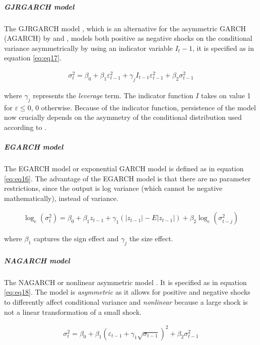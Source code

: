\documentclass[a4paper, nobind]{templates/ociamthesis}
\begin{document}
\hypertarget{gjrgarch-model}{%
\subparagraph{GJRGARCH model}\label{gjrgarch-model}}

\noindent The GJRGARCH model \autocite{glosten1993}, which is an alternative for the asymmetric GARCH (AGARCH) by \textcite{engle1990} and \textcite{engle1993}, models both positive as negative shocks on the conditional variance asymmetrically by using an indicator variable \(I_t-1\), it is specified as in equation \eqref{eq:eq17}.

\begin{align}
\sigma_t^2 = \beta_0 + \beta_1 \varepsilon_{t-1}^2 + \gamma_j I_{t-1} \varepsilon_{t-1}^2 + \beta_2 \sigma_{t-1}^2
 \label{eq:eq17}
\end{align}

\noindent where \(\gamma_j\) represents the \emph{leverage} term. The indicator function \(I\) takes on value 1 for \(\varepsilon \le 0\), 0 otherwise. Because of the indicator function, persistence of the model now crucially depends on the asymmetry of the conditional distribution used according to \textcite{ghalanos2020}.

\hypertarget{egarch-model}{%
\subparagraph{EGARCH model}\label{egarch-model}}

\noindent The EGARCH model or exponential GARCH model \autocite{nelson1991} is defined as in equation \eqref{eq:eq16}. The advantage of the EGARCH model is that there are no parameter restrictions, since the output is log variance (which cannot be negative mathematically), instead of variance.

\begin{align}
\log_e(\sigma_t^2) = \beta_0 + \beta_1 z_{t-1} + \gamma_1 (|z_{t-1}| - E|z_{t-1}|)+ \beta_2 \log_e(\sigma_{t-j}^2)
 \label{eq:eq16}
\end{align}

\noindent where \(\beta_1\) captures the sign effect and \(\gamma_j\) the size effect.

\hypertarget{nagarch-model}{%
\subparagraph{NAGARCH model}\label{nagarch-model}}

\noindent The NAGARCH or nonlinear asymmetric model \autocite{engle1993}. It is specified as in equation \eqref{eq:eq18}. The model is \emph{asymmetric} as it allows for positive and negative shocks to differently affect conditional variance and \emph{nonlinear} because a large shock is not a linear transformation of a small shock.

\begin{align}
\sigma_t^2 = \beta_0 + \beta_1 (\varepsilon_{t-1}+ \gamma_1 \sqrt{\sigma_{t-1}})^2 + \beta_2 \sigma_{t-1}^2
 \label{eq:eq18}
\end{align}
\end{document}
